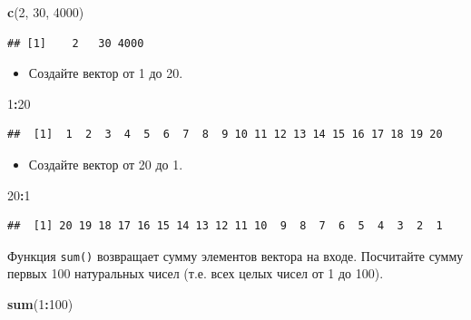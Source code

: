 \documentclass[]{book}
\newenvironment{Shaded}{\begin{snugshade}}{\end{snugshade}}
\newcommand{\KeywordTok}[1]{\textcolor[rgb]{0.13,0.29,0.53}{\textbf{#1}}}
\newcommand{\DecValTok}[1]{\textcolor[rgb]{0.00,0.00,0.81}{#1}}
\newcommand{\OperatorTok}[1]{\textcolor[rgb]{0.81,0.36,0.00}{\textbf{#1}}}
\newcommand{\NormalTok}[1]{#1}
\providecommand{\tightlist}{%
  \setlength{\itemsep}{0pt}\setlength{\parskip}{0pt}}
\begin{document}
\begin{Shaded}
\begin{Highlighting}[]
\KeywordTok{c}\NormalTok{(}\DecValTok{2}\NormalTok{, }\DecValTok{30}\NormalTok{, }\DecValTok{4000}\NormalTok{)}
\end{Highlighting}
\end{Shaded}

\begin{verbatim}
## [1]    2   30 4000
\end{verbatim}

\begin{itemize}
\tightlist
\item
  Создайте вектор от 1 до 20.
\end{itemize}

\begin{Shaded}
\begin{Highlighting}[]
\DecValTok{1}\OperatorTok{:}\DecValTok{20}
\end{Highlighting}
\end{Shaded}

\begin{verbatim}
##  [1]  1  2  3  4  5  6  7  8  9 10 11 12 13 14 15 16 17 18 19 20
\end{verbatim}

\begin{itemize}
\tightlist
\item
  Создайте вектор от 20 до 1.
\end{itemize}

\begin{Shaded}
\begin{Highlighting}[]
\DecValTok{20}\OperatorTok{:}\DecValTok{1}
\end{Highlighting}
\end{Shaded}

\begin{verbatim}
##  [1] 20 19 18 17 16 15 14 13 12 11 10  9  8  7  6  5  4  3  2  1
\end{verbatim}

Функция \texttt{sum()} возвращает сумму элементов вектора на входе.
Посчитайте сумму первых 100 натуральных чисел (т.е. всех целых чисел от
1 до 100).

\begin{Shaded}
\begin{Highlighting}[]
\KeywordTok{sum}\NormalTok{(}\DecValTok{1}\OperatorTok{:}\DecValTok{100}\NormalTok{)}
\end{Highlighting}
\end{Shaded}
\end{document}
